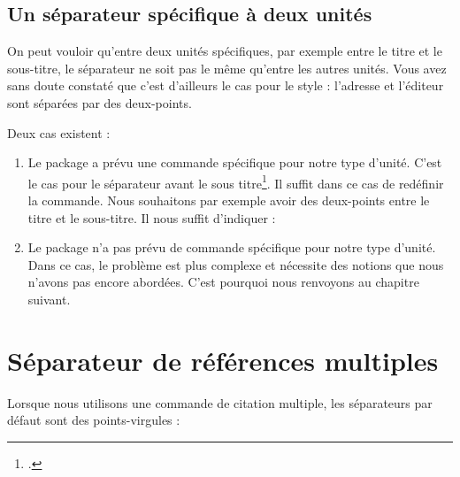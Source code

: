     
\subsection{Un séparateur spécifique à deux unités}
    
    On peut vouloir qu'entre deux unités spécifiques, par exemple entre le titre et le sous-titre, le séparateur ne soit pas le même qu'entre les autres unités.    Vous avez sans doute constaté que c'est d'ailleurs le cas pour le style  : l'adresse et l'éditeur sont séparées par des deux-points.
    
    Deux cas existent :
        \begin{enumerate}
            \item Le package  a prévu une commande spécifique pour notre type d'unité. C'est le cas pour le séparateur avant le sous titre\footcite[Ces commandes sont peu nombreuses : on les trouvera dans][]{biblatex_hooks}. Il suffit dans ce cas de redéfinir la commande. Nous souhaitons par exemple avoir des deux-points entre le titre et le sous-titre. Il nous suffit d'indiquer :
            
            \begin{latexcode}
\renewcommand{\subtitlepunct}[0]{\addspace\addcolon\addspace}
            \end{latexcode}

            
            \item Le package n'a pas prévu de commande spécifique pour notre type d'unité. Dans ce cas, le problème est plus complexe et nécessite des notions que nous n'avons pas encore abordées. C'est pourquoi nous renvoyons au  chapitre suivant.
        \end{enumerate}
        
\section{Séparateur de références multiples}\label{multicitedelim}

Lorsque nous utilisons une commande de citation multiple, les séparateurs par défaut sont des points-virgules :


\begin{latexcode}
\autocites{Saxer1980}{Junod1992}
\end{latexcode}

\bibverbose
\begin{quotation}
\cites{Saxer1980}{Junod1992}
\end{quotation}
\bibverbosetrad

